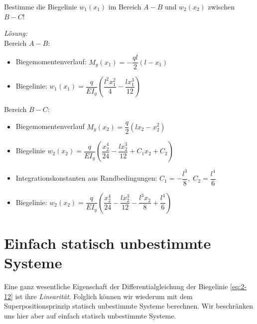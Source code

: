 \begin{example}
	Bestimme die Biegelinie $w_1(x_1)$ im Bereich $A - B$ und $w_2(x_2)$ zwischen $B - C$!
	\begin{center}
	
	\end{center}
	
	\textit{Lösung:}\\
	Bereich $A - B$:
	\begin{itemize}
		\item Biegemomentenverlauf: $M_y(x_1) = -\dfrac{ql}{2}\left(l-x_1\right)$
		\item Biegelinie: $w_1(x_1) = \dfrac{q}{EI_y}\left(\dfrac{l^2x_1^2}{4}-\dfrac{lx_1^3}{12}\right)$
	\end{itemize}
	Bereich $B - C$:
	\begin{itemize}
		\item Biegemomentenverlauf $M_y(x_2) = \dfrac{q}{2}(lx_2 - x_2^2)$
		\item Biegelinie $w_2(x_2) = \dfrac{q}{EI_y}\left(\dfrac{x_2^4}{24}-\dfrac{lx_2^3}{12}+C_1x_2 + C_2\right)$
		\item Integrationskonstanten aus Randbedingungen: $C_1 = -\dfrac{l^3}{8},\;C_2=\dfrac{l^4}{6}$
		\item Biegelinie: $w_2(x_2) = \dfrac{q}{EI_y}\left(\dfrac{x_2^4}{24}-\dfrac{lx_2^3}{12}-\dfrac{l^3x_2}{8}+\dfrac{l^4}{6}\right)$
	\end{itemize}
\end{example}



\section{Einfach statisch unbestimmte Systeme}

Eine ganz wesentliche Eigenschaft der Differentialgleichung der Biegelinie \eqref{eq:2-12} ist ihre \emph{Linearität}.
Folglich können wir wiederum mit dem Superpositionsprinzip statisch unbestimmte Systeme berechnen.
Wir beschränken uns hier aber auf einfach statisch unbestimmte Systeme. 

